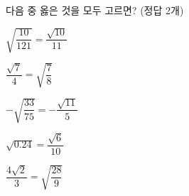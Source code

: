 다음 중 옳은 것을 모두 고르면? (정답 2개)
\begin{choicesii}{\rule[-3ex]{0pt}{8ex}$\sqrt{\dfrac{10}{121}}=\dfrac{\sqrt{10}}{11}$}{\rule[-3ex]{0pt}{8ex}$\dfrac{\sqrt{7}}{4}=\sqrt{\dfrac{7}{8}}$}{\rule[-3ex]{0pt}{8ex}$-\sqrt{\dfrac{33}{75}}=-\dfrac{\sqrt{11}}{5}$}{\rule[-3ex]{0pt}{8ex}$\sqrt{0.24}=\dfrac{\sqrt{6}}{10}$}{\rule[-3ex]{0pt}{8ex}$\dfrac{4\sqrt{2}}{3}=\sqrt{\dfrac{28}{9}}$}\end{choicesii}
